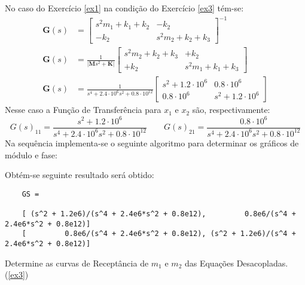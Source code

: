 \documentclass{article}
\begin{document}
\begin{resolution}
    No caso do Exercício \ref{ex1} na condição do Exercício \ref{ex3} tém-se:
    \begin{align*}
        \mathbf{G}(s) &= \begin{bmatrix} s^2 m_1 + k_1 + k_2 & -k_2\\ -k_2 & s^2 m_2 + k_2 + k_3\end{bmatrix}^{-1}\\
        \mathbf{G}(s) &= 
        \frac{1}{|\mathbf{M}s^2 + \mathbf{K}|}
        \begin{bmatrix} s^2 m_2 + k_2 + k_3 & +k_2\\ +k_2 & s^2 m_1 + k_1 + k_3\end{bmatrix}\\
        \mathbf{G}(s) &= 
        \frac{1}{s^4 + 2.4\cdot 10^6 s^2 + 0.8\cdot 10^{12}}
        \begin{bmatrix} s^2 + 1.2\cdot 10^6 & 0.8\cdot 10^6\\ 0.8\cdot 10^6 & s^2 + 1.2\cdot 10^6\end{bmatrix}
    \end{align*}
    Nesse caso a Função de Transferência para $x_1$ e $x_2$ são, respectivamente:
    \begin{equation*}
        \boxed{G(s)_{11} = \frac{s^2 + 1.2\cdot 10^6}{s^4 + 2.4\cdot 10^6 s^2 + 0.8\cdot 10^{12}}}
        \qquad
        \boxed{G(s)_{21} = \frac{      0.8\cdot 10^6}{s^4 + 2.4\cdot 10^6 s^2 + 0.8\cdot 10^{12}}}
    \end{equation*}
    Na sequência implementa-se o seguinte algoritmo para determinar os gráficos de módulo e fase:
    \begin{scriptsize}
        \myMatlab
    \end{scriptsize}
    Obtém-se seguinte resultado será obtido:
    \begin{scriptsize}
        \myMatlab\begin{lstlisting}
    GS =

    [ (s^2 + 1.2e6)/(s^4 + 2.4e6*s^2 + 0.8e12),         0.8e6/(s^4 + 2.4e6*s^2 + 0.8e12)]
    [         0.8e6/(s^4 + 2.4e6*s^2 + 0.8e12), (s^2 + 1.2e6)/(s^4 + 2.4e6*s^2 + 0.8e12)]
    \end{lstlisting}
    \end{scriptsize}
\end{resolution}


\newpage\begin{exercise}\label{ex7}
    Determine as curvas de Receptância de $m_1$ e $m_2$ das Equações Desacopladas. (\ref{ex3})
\end{exercise}
\begin{resolution}
    
\end{resolution}
\end{document}
